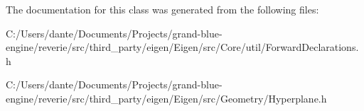 The documentation for this class was generated from the following files\+:\begin{DoxyCompactItemize}
\item 
C\+:/\+Users/dante/\+Documents/\+Projects/grand-\/blue-\/engine/reverie/src/third\+\_\+party/eigen/\+Eigen/src/\+Core/util/Forward\+Declarations.\+h\item 
C\+:/\+Users/dante/\+Documents/\+Projects/grand-\/blue-\/engine/reverie/src/third\+\_\+party/eigen/\+Eigen/src/\+Geometry/Hyperplane.\+h\end{DoxyCompactItemize}
